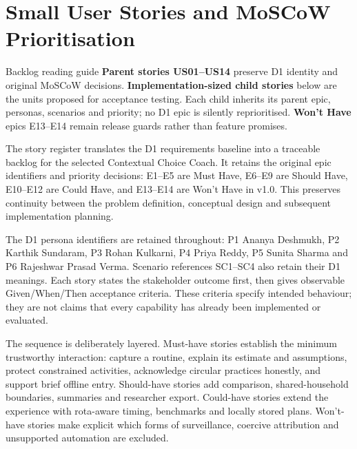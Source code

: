 \documentclass[12pt,a4paper]{article}
\begin{document}
\section{Small User Stories and MoSCoW Prioritisation}

\begin{chapterfocus}{Backlog reading guide}
\textbf{Parent stories US01--US14} preserve D1 identity and original MoSCoW decisions. \textbf{Implementation-sized child stories} below are the units proposed for acceptance testing. Each child inherits its parent epic, personas, scenarios and priority; no D1 epic is silently reprioritised. \textbf{Won't Have} epics E13--E14 remain release guards rather than feature promises.
\end{chapterfocus}


The story register translates the D1 requirements baseline into a traceable backlog for the selected Contextual Choice Coach. It retains the original epic identifiers and priority decisions: E1--E5 are Must Have, E6--E9 are Should Have, E10--E12 are Could Have, and E13--E14 are Won't Have in v1.0. This preserves continuity between the problem definition, conceptual design and subsequent implementation planning.

The D1 persona identifiers are retained throughout: P1 Ananya Deshmukh, P2 Karthik Sundaram, P3 Rohan Kulkarni, P4 Priya Reddy, P5 Sunita Sharma and P6 Rajeshwar Prasad Verma. Scenario references SC1--SC4 also retain their D1 meanings. Each story states the stakeholder outcome first, then gives observable Given/When/Then acceptance criteria. These criteria specify intended behaviour; they are not claims that every capability has already been implemented or evaluated.

The sequence is deliberately layered. Must-have stories establish the minimum trustworthy interaction: capture a routine, explain its estimate and assumptions, protect constrained activities, acknowledge circular practices honestly, and support brief offline entry. Should-have stories add comparison, shared-household boundaries, summaries and researcher export. Could-have stories extend the experience with rota-aware timing, benchmarks and locally stored plans. Won't-have stories make explicit which forms of surveillance, coercive attribution and unsupported automation are excluded.
\end{document}
